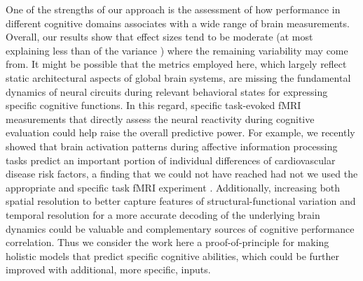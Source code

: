 \documentclass[10pt,letterpaper]{article}
\begin{document}
One of the strengths of our approach is the assessment of how performance in different cognitive domains associates with a wide range of brain measurements. Overall, our results show that effect sizes tend to be moderate (at most explaining less than  of the variance ) where the remaining variability may come from. It might be possible that the metrics employed here, which largely reflect static architectural aspects of global brain systems, are missing the fundamental dynamics of neural circuits during relevant behavioral states for expressing specific cognitive functions. In this regard, specific task-evoked fMRI measurements that directly assess the neural reactivity during cognitive evaluation \cite{Gray2003, WAITER2009199, GEAKE2005555} could help raise the overall predictive power. For example, we recently showed that brain activation patterns during affective information processing tasks predict an important portion of individual differences of cardiovascular disease risk factors, a finding that we could not have reached had not we used the appropriate and specific task fMRI experiment \cite{gianaros2020}. Additionally, increasing both spatial resolution to better capture features of structural-functional variation \cite{Diez2015} and temporal resolution for a more accurate decoding of the underlying brain dynamics \cite{FREEMAN200943} could be valuable and complementary sources of cognitive performance correlation. Thus we consider the work here a proof-of-principle for making holistic models that predict specific cognitive abilities, which could be further improved with additional, more specific, inputs.
\end{document}
